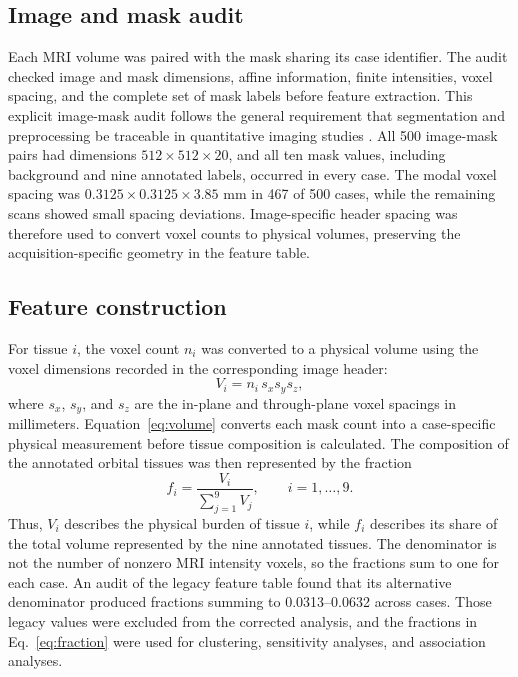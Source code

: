 \documentclass[utf8]{FrontiersinVancouver}
\begin{document}
\subsection{Image and mask audit}
Each MRI volume was paired with the mask sharing its case identifier. The audit checked image and mask dimensions, affine information, finite intensities, voxel spacing, and the complete set of mask labels before feature extraction. This explicit image-mask audit follows the general requirement that segmentation and preprocessing be traceable in quantitative imaging studies \citep{zwanenburg2020,song2022mri}. All 500 image-mask pairs had dimensions $512\times512\times20$, and all ten mask values, including background and nine annotated labels, occurred in every case. The modal voxel spacing was $0.3125\times0.3125\times3.85$ mm in 467 of 500 cases, while the remaining scans showed small spacing deviations. Image-specific header spacing was therefore used to convert voxel counts to physical volumes, preserving the acquisition-specific geometry in the feature table.

\subsection{Feature construction}
For tissue $i$, the voxel count $n_i$ was converted to a physical volume using the voxel dimensions recorded in the corresponding image header:
\begin{equation}
V_i=n_i\,s_xs_ys_z,
\label{eq:volume}
\end{equation}
where $s_x$, $s_y$, and $s_z$ are the in-plane and through-plane voxel spacings in millimeters. Equation~\ref{eq:volume} converts each mask count into a case-specific physical measurement before tissue composition is calculated. The composition of the annotated orbital tissues was then represented by the fraction
\begin{equation}
f_i=\frac{V_i}{\sum_{j=1}^{9}V_j}, \qquad i=1,\ldots,9.
\label{eq:fraction}
\end{equation}
Thus, $V_i$ describes the physical burden of tissue $i$, while $f_i$ describes its share of the total volume represented by the nine annotated tissues. The denominator is not the number of nonzero MRI intensity voxels, so the fractions sum to one for each case. An audit of the legacy feature table found that its alternative denominator produced fractions summing to 0.0313--0.0632 across cases. Those legacy values were excluded from the corrected analysis, and the fractions in Eq.~\ref{eq:fraction} were used for clustering, sensitivity analyses, and association analyses.
\end{document}
